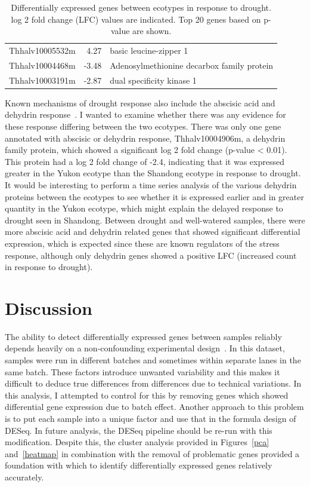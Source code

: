 \documentclass[12pt]{article}
\begin{document}
\begin{table}[H]
\begin{tabular}{lrl}
			Thhalv10005532m & 4.27  & basic leucine-zipper 1                                   \\
			Thhalv10004468m & -3.48 & Adenosylmethionine decarbox family protein          \\
			\rowcolor{Gray}
			Thhalv10003191m & -2.87 & dual specificity kinase 1 \\
			\bottomrule                            
		\end{tabular}
				\caption[Differentially expressed genes in response to drought]{Differentially expressed genes between ecotypes in response to drought. log 2 fold change (LFC) values are indicated. Top 20 genes based on p-value are shown.}
				\label{drought_genes}
	\end{table}
	
	Known mechanisms of drought response also include the abscisic acid and dehydrin response~\cite{farrant1996presence}. I wanted to examine whether there was any evidence for these response differing between the two ecotypes. There was only one gene annotated with abscisic or dehydrin response, Thhalv10004906m, a dehydrin family protein, which showed a significant log 2 fold change (p-value < 0.01). This protein had a log 2 fold change of -2.4, indicating that it was expressed greater in the Yukon ecotype than the Shandong ecotype in response to drought. It would be interesting to perform a time series analysis of the various dehydrin proteins between the ecotypes to see whether it is expressed earlier and in greater quantity in the Yukon ecotype, which might explain the delayed response to drought seen in Shandong. Between drought and well-watered samples, there were more abscisic acid and dehydrin related genes that showed significant differential expression, which is expected since these are known regulators of the stress response, although only dehydrin genes showed a positive LFC (increased count in response to drought).
	
	\section{Discussion}
	The ability to detect differentially expressed genes between samples reliably depends heavily on a non-confounding experimental design~\cite{leek2010tackling}. In this dataset, samples were run in different batches and sometimes within separate lanes in the same batch. These factors introduce unwanted variability and this makes it difficult to deduce true differences from differences due to technical variations. In this analysis, I attempted to control for this by removing genes which showed differential gene expression due to batch effect. Another approach to this problem is to put each sample into a unique factor and use that in the formula design of DESeq. In future analysis, the DESeq pipeline should be re-run with this modification. Despite this, the cluster analysis provided in Figures~\ref{pca} and~\ref{heatmap} in combination with the removal of problematic genes provided a foundation with which to identify differentially expressed genes relatively accurately.
	
\end{document}
